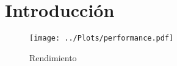 \chapter{Introducción}
\label{cap:introduction}

\begin{figure}
    \centering
    \texttt{[image: ../Plots/performance.pdf]}
    \caption{Rendimiento}
\end{figure}
